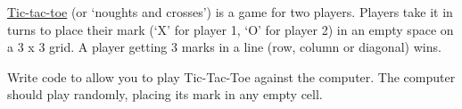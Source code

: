 \documentclass[11pt]{article}
\begin{document}
\href{https://en.wikipedia.org/wiki/Tic-tac-toe}{Tic-tac-toe} (or
`noughts and crosses') is a game for two players. Players take it in
turns to place their mark (`X' for player 1, `O' for player 2) in an
empty space on a 3 x 3 grid. A player getting 3 marks in a line (row,
column or diagonal) wins.

Write code to allow you to play Tic-Tac-Toe against the computer. The
computer should play randomly, placing its mark in any empty cell.


    
    
    
    
\end{document}
